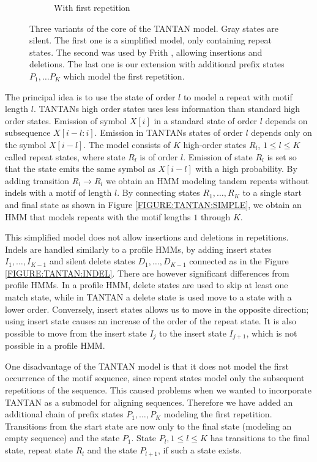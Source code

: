 \begin{figure}
\begin{center}
\begin{subfigure}{0.35\textwidth}
\caption{With first repetition}\label{FIGURE:TANTAN:INIT}
\end{subfigure}%
\end{center}
\caption[TANTAN model]{Three variants of the core of the TANTAN model. Gray states are
silent. The first one is a simplified model, only containing repeat states. The second
was used by Frith \cite{Frith2011}, allowing insertions and deletions.  The last one
is our extension with additional prefix states $P_1, \dots P_K$ which model
the first repetition.}\label{FIGURE:TANTAN}
\end{figure}

The principal idea is to use the state of order $l$ to model a repeat with
motif length $l$. TANTANs high order states uses less information than standard
high order states. Emission of symbol $X[i]$ in a standard state of order $l$
depends on subsequence $X[i-l:i]$.  Emission in TANTANs states of order $l$
depends only on the symbol $X[i-l]$. The model consists of $K$ high-order
states $R_l$, $1\leq l\leq K$ called repeat states, where state $R_l$ is of
order $l$. Emission of state $R_l$ is set so that the state emits the same
symbol as $X[i-l]$ with a high probability. By adding transition $R_l\to R_l$
we obtain an HMM modeling tandem repeats without indels with a motif of length
$l$. By connecting states $R_1,\dots, R_K$ to a single start and final state as
shown in Figure \ref{FIGURE:TANTAN:SIMPLE}, we obtain an HMM that models
repeats with the motif lengths $1$ through $K$.

This simplified model does not allow insertions and deletions in repetitions.
Indels are handled similarly to a profile HMMs, by adding insert states
$I_1,\dots, I_{K-1}$ and silent delete states $D_1, \dots, D_{K-1}$ connected
as in the Figure \ref{FIGURE:TANTAN:INDEL}. There are however significant
differences from profile HMMs.  In a profile HMM, delete states are used to
skip at least one match state, while in TANTAN a delete state is used move to a
state with a lower order. Conversely, insert states allows us to move in the
opposite direction; using insert state causes an increase of the order of the
repeat state.  It is also possible to move from the insert state $I_{j}$ to the
insert state $I_{j+1}$, which is not possible in a profile HMM.

One disadvantage of the TANTAN model is that it does not model the first
occurrence of the motif sequence, since repeat states model only the
subsequent repetitions of the sequence. This caused problems when we wanted to
incorporate TANTAN as a submodel for aligning sequences. Therefore we have
added an additional chain of prefix states $P_1,\dots, P_K$ modeling the first
repetition. Transitions from the start state are now only to the final state
(modeling an empty sequence) and the state $P_1$. State $P_l, 1\leq l\leq K$
has transitions to the final state, repeat state $R_l$ and the state $P_{l+1}$,
if such a state exists.

